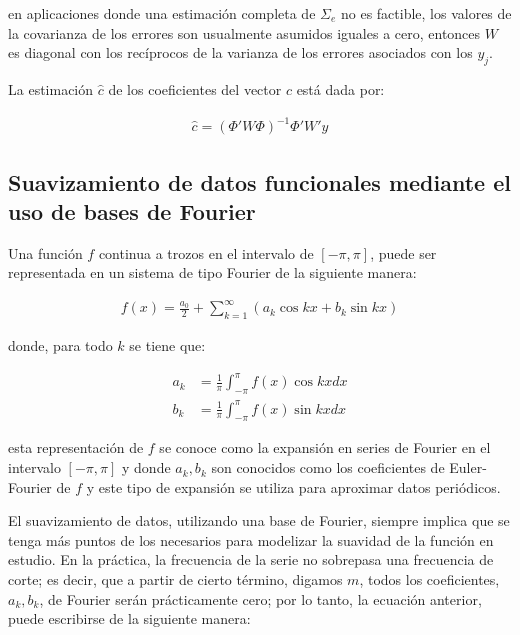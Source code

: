 \documentclass[
]{book}
\begin{document}
en aplicaciones donde una estimación completa de \(\Sigma_e\) no es factible, los valores de la covarianza de los errores son usualmente asumidos iguales a cero, entonces \(W\) es diagonal con los recíprocos de la varianza de los errores asociados con los \(y_j\).

La estimación \({\hat{c}}\) de los coeficientes del vector \(c\) está dada por:

\begin{align}
    {\hat{c}}=(\Phi'W\Phi)^{-1}\Phi'W'y
\end{align}

\hypertarget{suavizamiento-de-datos-funcionales-mediante-el-uso-de-bases-de-fourier}{%
\subsection*{Suavizamiento de datos funcionales mediante el uso de bases de Fourier}\label{suavizamiento-de-datos-funcionales-mediante-el-uso-de-bases-de-fourier}}

Una función \(f\) continua a trozos en el intervalo de \([-\pi,\pi]\), puede ser representada en un sistema de tipo Fourier de la siguiente manera:

\begin{align}
    f(x)=\frac{a_0}{2}+\sum_{k=1}^\infty(a_k\cos{kx}+b_k\sin{kx})
\end{align}

donde, para todo \(k\) se tiene que:

\begin{align}
    a_k&=\frac{1}{\pi}\int_{-\pi}^\pi f(x)\cos{kx}dx\\
    b_k&=\frac{1}{\pi}\int_{-\pi}^\pi f(x) \sin{kx}dx
\end{align}

esta representación de \(f\) se conoce como la expansión en series de Fourier en el intervalo \([-\pi,\pi]\) y donde \(a_k,b_k\) son conocidos como los coeficientes de Euler-Fourier de \(f\) \citep{kreider} y este tipo de expansión se utiliza para aproximar datos periódicos.

El suavizamiento de datos, utilizando una base de Fourier, siempre implica que se tenga más puntos de los necesarios para modelizar la suavidad de la función en estudio. En la práctica, la frecuencia de la serie no sobrepasa una frecuencia de corte; es decir, que a partir de cierto término, digamos \(m\), todos los coeficientes, \(a_k, b_k\), de Fourier serán prácticamente cero; por lo tanto, la ecuación anterior, puede escribirse de la siguiente manera:
\end{document}
